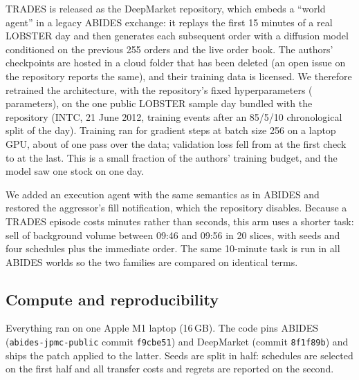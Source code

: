 TRADES \citep{berti2025trades} is released as the DeepMarket repository, which embeds a ``world agent'' in a legacy ABIDES exchange: it replays the first 15 minutes of a real LOBSTER day \citep{huang2011lobster} and then generates each subsequent order with a diffusion model conditioned on the previous 255 orders and the live order book. The authors' checkpoints are hosted in a cloud folder that has been deleted (an open issue on the repository reports the same), and their training data is licensed. We therefore retrained the architecture, with the repository's fixed hyperparameters (\tradesParams{} parameters), on the one public LOBSTER sample day bundled with the repository (INTC, 21 June 2012, \tradesTrainRows{} training events after an 85/5/10 chronological split of the day). Training ran for \tradesSteps{} gradient steps at batch size 256 on a laptop GPU, about \tradesEpochFrac{} of one pass over the data; validation loss fell from \tradesValStart{} at the first check to \tradesValEnd{} at the last. This is a small fraction of the authors' training budget, and the model saw one stock on one day.

We added an execution agent with the same semantics as in ABIDES and restored the aggressor's fill notification, which the repository disables. Because a TRADES episode costs minutes rather than seconds, this arm uses a shorter task: sell \tradesSize{} of background volume between 09:46 and 09:56 in 20 slices, with \tradesSeeds{} seeds and four schedules plus the immediate order. The same 10-minute task is run in all ABIDES worlds so the two families are compared on identical terms.

\subsection{Compute and reproducibility}

Everything ran on one Apple M1 laptop (16\,GB). The code pins ABIDES (\texttt{abides-jpmc-public} commit \texttt{f9cbe51}) and DeepMarket (commit \texttt{8f1f89b}) and ships the patch applied to the latter. Seeds are split in half: schedules are selected on the first half and all transfer costs and regrets are reported on the second.

